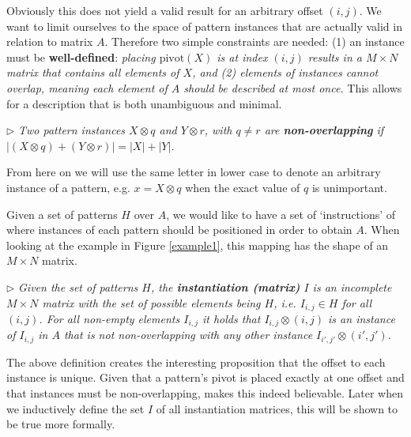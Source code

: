 \documentclass{llncs}
\begin{document}
Obviously this does not yield a valid result for an arbitrary offset $(i,j)$. We want to limit ourselves to the space of pattern instances that are actually valid in relation to matrix $A$. Therefore two simple constraints are needed: (1) an instance must be \textbf{well-defined}: \emph{placing $\mathrm{pivot}(X)$ is at index $(i,j)$ results in a $M\times N$ matrix that contains all elements of $X$, and (2) elements of instances cannot overlap, meaning each element of $A$ should be described at most once.} This allows for a description that is both unambiguous and minimal.

\smallskip
\noindent $\triangleright$
\emph{Two pattern instances $X \otimes {q}$ and $Y \otimes {r}$, with ${q} \neq {r}$ are \textbf{non-overlapping} if $|(X \otimes {q}) + (Y \otimes {r})| = |X|+|Y|$.}
\smallskip

From here on we will use the same letter in lower case to denote an arbitrary instance of a pattern, e.g. $x = X \otimes {q}$ when the exact value of ${q}$ is unimportant.

Given a set of patterns $H$ over $A$, we would like to have a set of `instructions' of where instances of each pattern should be positioned in order to obtain $A$. When looking at the example in Figure \ref{example1}, this mapping has the shape of an $M\times N$ matrix.

\smallskip
\noindent $\triangleright$
\emph{Given the set of patterns $H$, the \textbf{instantiation (matrix)} ${I}$ is an incomplete $M\times N$ matrix with the set of possible elements being $H$, i.e. ${I}_{i,j} \in H$ for all $(i,j)$. For all non-empty elements ${I}_{i,j}$ it holds that ${I}_{i,j} \otimes (i,j)$ is an instance of ${I}_{i,j}$ in $A$ that is not non-overlapping with any other instance ${I}_{i',j'} \otimes (i',j')$.}
\smallskip

The above definition creates the interesting proposition that the offset to each instance is unique. Given that a pattern's pivot is placed exactly at one offset and that instances must be non-overlapping, makes this indeed believable. Later when we inductively define the set ${I}$ of all instantiation matrices, this will be shown to be true more formally. 
\end{document}

